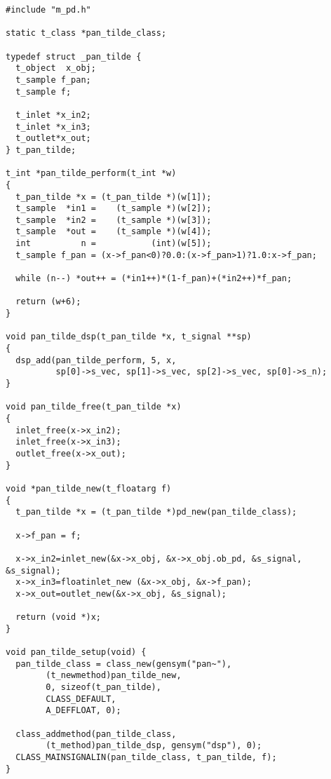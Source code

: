\documentclass[12pt, a4paper,english,titlepage]{article}
\begin{document}
\begin{verbatim}
#include "m_pd.h"

static t_class *pan_tilde_class;

typedef struct _pan_tilde {
  t_object  x_obj;
  t_sample f_pan;
  t_sample f;

  t_inlet *x_in2;
  t_inlet *x_in3;
  t_outlet*x_out;
} t_pan_tilde;

t_int *pan_tilde_perform(t_int *w)
{
  t_pan_tilde *x = (t_pan_tilde *)(w[1]);
  t_sample  *in1 =    (t_sample *)(w[2]);
  t_sample  *in2 =    (t_sample *)(w[3]);
  t_sample  *out =    (t_sample *)(w[4]);
  int          n =           (int)(w[5]);
  t_sample f_pan = (x->f_pan<0)?0.0:(x->f_pan>1)?1.0:x->f_pan;

  while (n--) *out++ = (*in1++)*(1-f_pan)+(*in2++)*f_pan;

  return (w+6);
}

void pan_tilde_dsp(t_pan_tilde *x, t_signal **sp)
{
  dsp_add(pan_tilde_perform, 5, x,
          sp[0]->s_vec, sp[1]->s_vec, sp[2]->s_vec, sp[0]->s_n);
}

void pan_tilde_free(t_pan_tilde *x)
{
  inlet_free(x->x_in2);
  inlet_free(x->x_in3);
  outlet_free(x->x_out);
}

void *pan_tilde_new(t_floatarg f)
{
  t_pan_tilde *x = (t_pan_tilde *)pd_new(pan_tilde_class);

  x->f_pan = f;
  
  x->x_in2=inlet_new(&x->x_obj, &x->x_obj.ob_pd, &s_signal, &s_signal);
  x->x_in3=floatinlet_new (&x->x_obj, &x->f_pan);
  x->x_out=outlet_new(&x->x_obj, &s_signal);

  return (void *)x;
}

void pan_tilde_setup(void) {
  pan_tilde_class = class_new(gensym("pan~"),
        (t_newmethod)pan_tilde_new,
        0, sizeof(t_pan_tilde),
        CLASS_DEFAULT, 
        A_DEFFLOAT, 0);

  class_addmethod(pan_tilde_class,
        (t_method)pan_tilde_dsp, gensym("dsp"), 0);
  CLASS_MAINSIGNALIN(pan_tilde_class, t_pan_tilde, f);
}
\end{verbatim}
\end{document}
